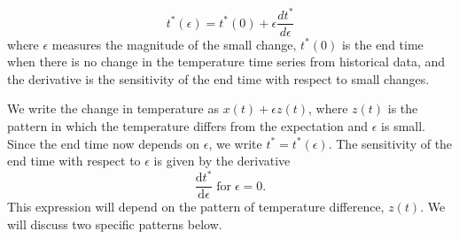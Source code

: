 \documentclass[12 pt]{article}
\begin{document}
\begin{equation}
    t^*(\epsilon) = t^*(0) + \epsilon \frac{d t^*}{d\epsilon} \tag*{Eq. S\theequation}
\end{equation}
where $\epsilon$ measures the magnitude of the small change, $t^*(0)$ is the end time when there is no change in the temperature time series from historical data, and the derivative is the sensitivity of the end time with respect to small changes. \par
We write the change in temperature as $x(t) + \epsilon z(t)$, where $z(t)$ is the pattern in which the temperature differs from the expectation and $\epsilon$ is small.  Since the end time now depends on $\epsilon$, we write $t^*=t^* (\epsilon)$.  The sensitivity of the end time with respect to $\epsilon$ is given by the derivative
\begin{equation}
    \frac{\mathrm{d}t^*}{\mathrm{d}\epsilon} \; \text{for} \; \epsilon = 0. \tag*{Eq. S\theequation}
\end{equation}
This expression will depend on the pattern of temperature difference, $z(t)$. We will discuss two specific patterns below. \par
\end{document}
